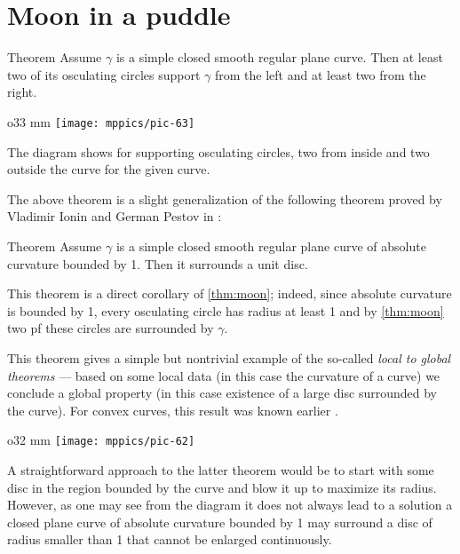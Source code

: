 \section*{Moon in a puddle}

\begin{thm}{Theorem}\label{thm:moon}
Assume $\gamma$ is a simple closed smooth regular plane curve.
Then at least two of its osculating circles support $\gamma$ from the left and  at least two from the right.
\end{thm}

\begin{wrapfigure}{o}{33 mm}
\vskip4mm
\centering
\texttt{[image: mppics/pic-63]}
\vskip0mm
\end{wrapfigure}

The diagram shows for supporting osculating circles, two from inside and two outside the curve for the given curve.

The above theorem is a slight generalization of the following theorem proved by Vladimir Ionin and German Pestov in \cite{pestov-ionin}:

\begin{thm}{Theorem}\label{thm:moon-orginal}
Assume $\gamma$ is a simple closed smooth regular plane curve of absolute curvature bounded by 1.
Then it surrounds a unit disc.
\end{thm}

This theorem is a direct corollary of \ref{thm:moon};
indeed, since absolute curvature is bounded by 1, every osculating circle has radius at least 1 and by \ref{thm:moon} two pf these circles are surrounded by $\gamma$.

This theorem gives a simple but nontrivial example of the so-called \emph{local to global theorems} --- based on some local data (in this case the curvature of a curve) we conclude a global property (in this case existence of a large disc surrounded by the curve).
For convex curves, this result was known earlier \cite[\S 24]{blaschke}.

\begin{wrapfigure}{o}{32 mm}
\vskip-0mm
\centering
\texttt{[image: mppics/pic-62]}
\vskip0mm
\end{wrapfigure}

A straightforward approach to the latter theorem would be to start with some disc in the region bounded by the curve and blow it up to maximize its radius.
However, as one may see from the diagram it does not always lead to a solution a closed plane curve of absolute curvature bounded by 1 may surround a disc of radius smaller than 1 that cannot be enlarged continuously.  

